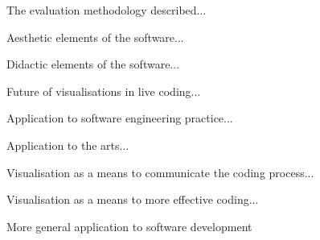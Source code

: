 The evaluation methodology described...



Aesthetic elements of the software...

Didactic elements of the software...

Future of visualisations in live coding...

Application to software engineering practice...

Application to the arts...

Visualisation as a means to communicate the coding process...

Visualisation as a means to more effective coding...

More general application to software development


